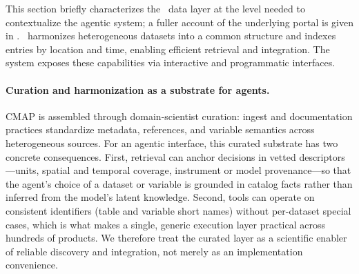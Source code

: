 This section briefly characterizes the \cmap\ data layer at the level needed to contextualize the agentic system; a fuller account of the underlying portal is given in \citet{Ashkezari2021SimonsCMAP}.
\cmap\ harmonizes heterogeneous datasets into a common structure and indexes entries by location and time, enabling efficient retrieval and integration. The system exposes these capabilities via interactive and programmatic interfaces.

\paragraph{Curation and harmonization as a substrate for agents.}
CMAP is assembled through domain-scientist curation: ingest and documentation practices standardize metadata, references, and variable semantics across heterogeneous sources.
For an agentic interface, this curated substrate has two concrete consequences.
First, retrieval can anchor decisions in vetted descriptors---units, spatial and temporal coverage, instrument or model provenance---so that the agent's choice of a dataset or variable is grounded in catalog facts rather than inferred from the model's latent knowledge.
Second, tools can operate on consistent identifiers (table and variable short names) without per-dataset special cases, which is what makes a single, generic execution layer practical across hundreds of products.
We therefore treat the curated layer as a scientific enabler of reliable discovery and integration, not merely as an implementation convenience.
